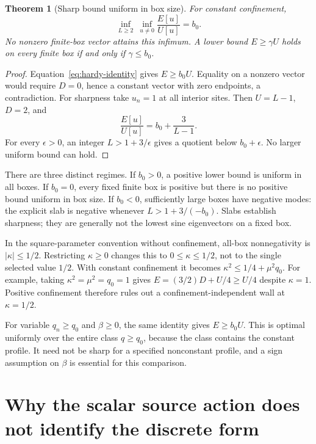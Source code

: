 \documentclass[11pt,letterpaper]{article}
\newtheorem{theorem}{Theorem}[section]
\theoremstyle{definition}
\numberwithin{equation}{section}
\begin{document}
\begin{theorem}[Sharp bound uniform in box size]
For constant confinement,
\begin{equation}
 \inf_{L\ge2}\ \inf_{u\ne0}\frac{E[u]}{U[u]}=b_0.
 \label{eq:uniform-floor}
\end{equation}
No nonzero finite-box vector attains this infimum. A lower bound
$E\ge\gamma U$ holds on every finite box if and only if $\gamma\le b_0$.
\end{theorem}
\begin{proof}
Equation~\eqref{eq:hardy-identity} gives $E\ge b_0U$. Equality on a
nonzero vector would require $D=0$, hence a constant vector with zero
endpoints, a contradiction. For sharpness take $u_n=1$ at all interior
sites. Then $U=L-1$, $D=2$, and
\begin{equation}
 \frac{E[u]}{U[u]}=b_0+\frac3{L-1}.
 \label{eq:slab}
\end{equation}
For every $\epsilon>0$, an integer $L>1+3/\epsilon$ gives a quotient
below $b_0+\epsilon$. No larger uniform bound can hold.
\end{proof}

There are three distinct regimes. If $b_0>0$, a positive lower bound is
uniform in all boxes. If $b_0=0$, every fixed finite box is positive but
there is no positive bound uniform in box size. If $b_0<0$, sufficiently
large boxes have negative modes: the explicit slab is negative whenever
$L>1+3/(-b_0)$. Slabs establish sharpness; they are generally not the
lowest sine eigenvectors on a fixed box.

In the square-parameter convention without confinement, all-box
nonnegativity is $|\kappa|\le1/2$. Restricting $\kappa\ge0$ changes this
to $0\le\kappa\le1/2$, not to the single selected value $1/2$.
With constant confinement it becomes
$\kappa^2\le1/4+\mu^2q_0$. For example, taking
$\kappa^2=\mu^2=q_0=1$ gives
$E=(3/2)D+U/4\ge U/4$ despite $\kappa=1$. Positive confinement therefore
rules out a confinement-independent wall at $\kappa=1/2$.

For variable $q_n\ge q_0$ and $\beta\ge0$, the same identity gives
$E\ge b_0U$. This is optimal uniformly over the entire class
$q\ge q_0$, because the class contains the constant profile. It need
not be sharp for a specified nonconstant profile, and a sign assumption
on $\beta$ is essential for this comparison.

\section{Why the scalar source action does not identify the discrete form}
\label{sec:source-bridge}
\end{document}
